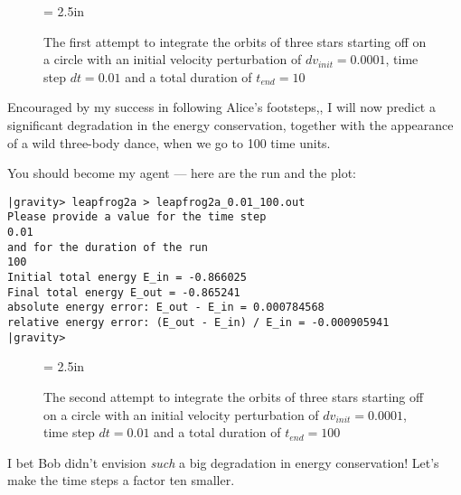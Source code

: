 \begin{figure}[htb]
\begin{center}
\epsfxsize = 2.5in
\caption[Three stars on a circle, leapfrog, $dv_{init}=0.0001$, $dt = 0.01$,
$t_{end} = 10$]
{The first attempt to integrate the orbits of three stars
starting off on a circle with an initial velocity perturbation of 
$dv_{init}=0.0001$, time step $dt = 0.01$ and a total duration of
$t_{end} = 10$}
\label{fig:leap2a-0.01-10}
\end{center}
\end{figure}

\abc

\bob
Encouraged by my success in following Alice's footsteps,, I will now
predict a significant degradation in the energy conservation, together
with the appearance of a wild three-body dance, when we go to 100 time
units.

\alice
You should become my agent --- here are the run and the plot:

\cba

\begin{small}
\begin{verbatim}
|gravity> leapfrog2a > leapfrog2a_0.01_100.out
Please provide a value for the time step
0.01
and for the duration of the run
100
Initial total energy E_in = -0.866025
Final total energy E_out = -0.865241
absolute energy error: E_out - E_in = 0.000784568
relative energy error: (E_out - E_in) / E_in = -0.000905941
|gravity>
\end{verbatim}
\end{small}

\begin{figure}[htb]
\begin{center}
\epsfxsize = 2.5in
\caption[Three stars on a circle, leapfrog, $dv_{init}=0.0001$, $dt = 0.01$,
$t_{end} = 100$]
{The second attempt to integrate the orbits of three stars
starting off on a circle with an initial velocity perturbation of 
$dv_{init}=0.0001$, time step $dt = 0.01$ and a total duration of
$t_{end} = 100$}
\label{fig:leap2a-0.01-100}
\end{center}
\end{figure}

\abc

\carol
I bet Bob didn't envision {\it such} a big degradation in energy
conservation!  Let's make the time steps a factor ten smaller.

\cba

